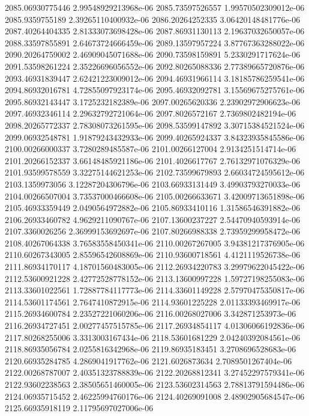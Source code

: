 {2085.06930775446 2.99548929213968e-06
2085.73597526557 1.99570502309012e-06
2085.9359755189 2.39265110400932e-06
2086.20264252335 3.06420148481776e-06
2087.40264404335 2.81333073698428e-06
2087.86931130113 2.19637032650057e-06
2088.33597855891 2.64673724666459e-06
2089.13597957224 3.87767363288022e-06
2090.20264759002 2.46909045071688e-06
2090.73598159891 5.2330291717624e-06
2091.53598261224 2.35226696056552e-06
2092.80265088336 2.77389665720876e-06
2093.46931839447 2.62421223009012e-06
2094.46931966114 3.18185786259541e-06
2094.86932016781 4.72855097923174e-06
2095.46932092781 3.15569675275761e-06
2095.86932143447 3.1725232182389e-06
2097.00265620336 2.23902972906623e-06
2097.46932346114 2.29632792721064e-06
2097.8026572167 2.7369802482194e-06
2098.20265772337 2.78308073261595e-06
2098.53599147892 3.30715384521524e-06
2099.06932548781 1.91879243432933e-06
2099.40265924337 3.84323935845586e-06
2100.00266000337 3.7280289485587e-06
2101.00266127004 2.9134251514714e-06
2101.20266152337 3.66148485921186e-06
2101.4026617767 2.76132971076329e-06
2101.93599578559 3.32275144621253e-06
2102.73599679893 2.66034724595612e-06
2103.1359973056 3.12287204306796e-06
2103.66933131449 3.49903793270033e-06
2104.00266507004 3.73537000466608e-06
2105.00266633671 3.42009713651898e-06
2105.46933359449 2.0490564972882e-06
2105.86933410116 1.31586546391882e-06
2106.26933460782 4.9629211090767e-06
2107.13600237227 2.54470940593914e-06
2107.3360026256 2.36999153692697e-06
2107.80266988338 2.73959299958472e-06
2108.40267064338 3.76583558450341e-06
2110.00267267005 3.94381217376905e-06
2110.60267343005 2.85596542608869e-06
2110.93600718561 4.4121119526738e-06
2111.86934170117 4.18701560483005e-06
2112.26934220783 3.29979622045422e-06
2112.53600921228 2.42772528778152e-06
2113.13600997228 1.59727198255083e-06
2113.33601022561 1.72887784117773e-06
2114.33601149228 2.57970475350817e-06
2114.53601174561 2.7647410872915e-06
2114.93601225228 2.01133393469917e-06
2115.26934600784 2.23527221060206e-06
2116.00268027006 3.342871253973e-06
2116.26934727451 2.00277457515785e-06
2117.26934854117 4.01306066192836e-06
2117.80268255006 3.3313003167434e-06
2118.53601681229 2.04240392084561e-06
2118.86935056784 2.0255816342968e-06
2119.86935183451 3.2708696528683e-06
2120.66935284785 4.2869041917762e-06
2121.6026873634 2.7089501267404e-06
2122.00268787007 2.40351323788839e-06
2122.20268812341 3.27452297579341e-06
2122.93602238563 2.38505651460005e-06
2123.53602314563 2.78813791594486e-06
2124.06935715452 2.46225994760176e-06
2124.40269091008 2.48902905684547e-06
2125.66935918119 2.11795697027006e-06
}
